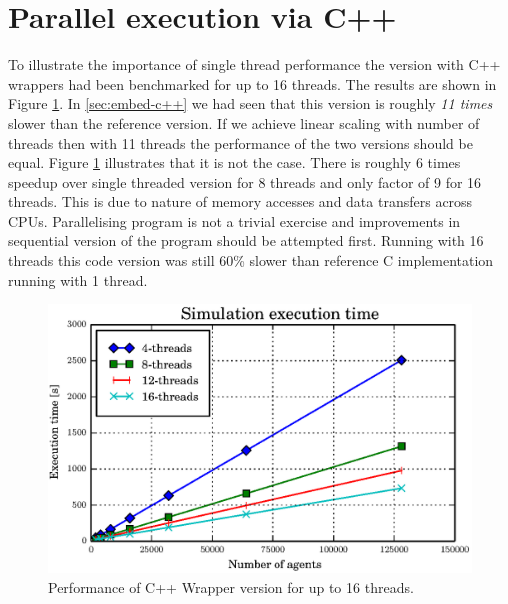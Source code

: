 \documentclass[12pt, a4paper]{report}
\begin{document}
\section{Parallel execution via C++}\label{sec:para-c++}
To illustrate the importance of single thread performance the version with C++ wrappers
had been benchmarked for up to 16 threads. The results are shown in Figure \ref{fig:gil-free-multi-16-perf}.
In \ref{sec:embed-c++} we had seen that this version is roughly \emph{11 times} slower
than the reference version. If we achieve linear scaling with number of threads
then with 11 threads the performance of the two versions should be equal. Figure
\ref{fig:gil-free-multi-16-perf} illustrates that it is not the case. There is roughly
6 times speedup over single threaded version for 8 threads and only factor of 9 for 16
threads. This is due to nature of memory accesses and data transfers across CPUs.
Parallelising program is not a trivial exercise and improvements in sequential version
of the program should be attempted first. Running with 16 threads this code version was
still 60\% slower than reference C implementation running with 1 thread.

\begin{figure}[H]
  \begin{center}
    \includegraphics[width=\columnwidth]{graphs/gil-free-multi-16-perf.eps}
    \caption{Performance of C++ Wrapper version for up to 16 threads.}
    \label{fig:gil-free-multi-16-perf}
  \end{center}
\end{figure}
\end{document}
